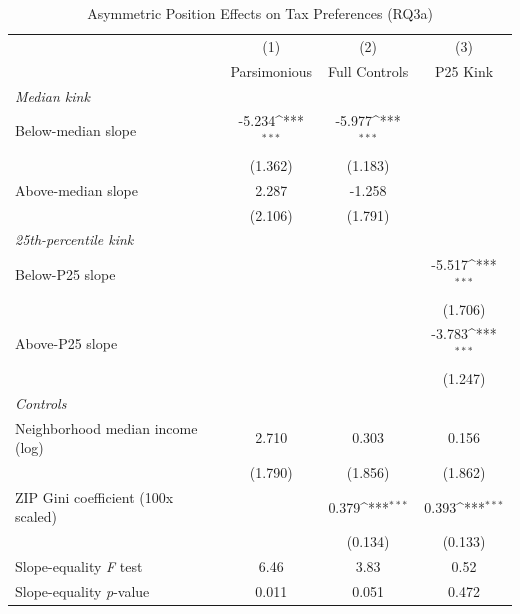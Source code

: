 \begin{table}[htbp]\centering
\def\sym#1{\ifmmode^{#1}\else\(^{#1}\)\fi}
\caption{Asymmetric Position Effects on Tax Preferences (RQ3a)}
\begin{tabular}{l*{3}{c}}
\toprule
            &\multicolumn{1}{c}{(1)}&\multicolumn{1}{c}{(2)}&\multicolumn{1}{c}{(3)}\\
            &\multicolumn{1}{c}{Parsimonious}&\multicolumn{1}{c}{Full Controls}&\multicolumn{1}{c}{P25 Kink}\\
\midrule
\textit{Median kink}&                     &                     &                     \\
Below-median slope&      -5.234\sym{***}&      -5.977\sym{***}&                     \\
            &     (1.362)         &     (1.183)         &                     \\
Above-median slope&       2.287         &      -1.258         &                     \\
            &     (2.106)         &     (1.791)         &                     \\
\textit{25th-percentile kink}&                     &                     &                     \\
Below-P25 slope&                     &                     &      -5.517\sym{***}\\
            &                     &                     &     (1.706)         \\
Above-P25 slope&                     &                     &      -3.783\sym{***}\\
            &                     &                     &     (1.247)         \\
\textit{Controls}&                     &                     &                     \\
Neighborhood median income (log)&       2.710         &       0.303         &       0.156         \\
            &     (1.790)         &     (1.856)         &     (1.862)         \\
ZIP Gini coefficient (100x scaled)&                     &       0.379\sym{***}&       0.393\sym{***}\\
            &                     &     (0.134)         &     (0.133)         \\
\midrule
Slope-equality \textit{F} test&        6.46         &        3.83         &        0.52         \\
Slope-equality \textit{p}-value&       0.011         &       0.051         &       0.472         \\

\end{tabular}
\end{table}
